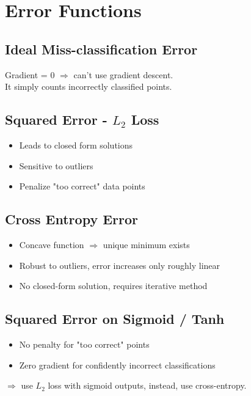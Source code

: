 \chapter{Error Functions}

\section{Ideal Miss-classification Error}
Gradient = 0 $\Rightarrow$ can't use gradient descent.\\
It simply counts incorrectly classified points.

\section{Squared Error - $L_2$ Loss}
\begin{itemize}
	\item Leads to closed form solutions
	\item Sensitive to outliers
	\item Penalize "too correct" data points
\end{itemize}

\section{Cross Entropy Error}
\begin{itemize}
	\item Concave function $\Rightarrow$ unique minimum exists
	\item Robust to outliers, error increases only roughly linear
	\item No closed-form solution, requires iterative method
\end{itemize}

\section{Squared Error on Sigmoid / Tanh}
\begin{itemize}
	\item No penalty for "too correct" points
	\item Zero gradient for confidently incorrect classifications
\end{itemize}
$\Rightarrow$  use $L_2$ loss with sigmoid outputs, instead, use cross-entropy.

